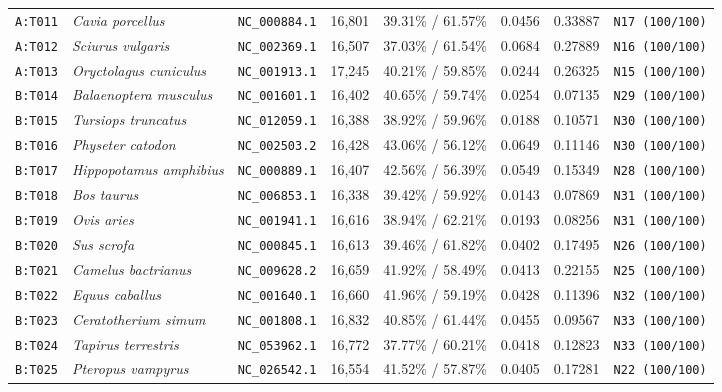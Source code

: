 \documentclass[10pt,letterpaper]{article}
\begin{document}
\begin{longtable}{llllllll}
\texttt{A:T011} & \textit{Cavia porcellus} & \texttt{NC\_000884.1} & 16,801 & 39.31\% / 61.57\% & 0.0456 & 0.33887 & \texttt{N17 (100/100)} \\
\texttt{A:T012} & \textit{Sciurus vulgaris} & \texttt{NC\_002369.1} & 16,507 & 37.03\% / 61.54\% & 0.0684 & 0.27889 & \texttt{N16 (100/100)} \\
\texttt{A:T013} & \textit{Oryctolagus cuniculus} & \texttt{NC\_001913.1} & 17,245 & 40.21\% / 59.85\% & 0.0244 & 0.26325 & \texttt{N15 (100/100)} \\
\texttt{B:T014} & \textit{Balaenoptera musculus} & \texttt{NC\_001601.1} & 16,402 & 40.65\% / 59.74\% & 0.0254 & 0.07135 & \texttt{N29 (100/100)} \\
\texttt{B:T015} & \textit{Tursiops truncatus} & \texttt{NC\_012059.1} & 16,388 & 38.92\% / 59.96\% & 0.0188 & 0.10571 & \texttt{N30 (100/100)} \\
\texttt{B:T016} & \textit{Physeter catodon} & \texttt{NC\_002503.2} & 16,428 & 43.06\% / 56.12\% & 0.0649 & 0.11146 & \texttt{N30 (100/100)} \\
\texttt{B:T017} & \textit{Hippopotamus amphibius} & \texttt{NC\_000889.1} & 16,407 & 42.56\% / 56.39\% & 0.0549 & 0.15349 & \texttt{N28 (100/100)} \\
\texttt{B:T018} & \textit{Bos taurus} & \texttt{NC\_006853.1} & 16,338 & 39.42\% / 59.92\% & 0.0143 & 0.07869 & \texttt{N31 (100/100)} \\
\texttt{B:T019} & \textit{Ovis aries} & \texttt{NC\_001941.1} & 16,616 & 38.94\% / 62.21\% & 0.0193 & 0.08256 & \texttt{N31 (100/100)} \\
\texttt{B:T020} & \textit{Sus scrofa} & \texttt{NC\_000845.1} & 16,613 & 39.46\% / 61.82\% & 0.0402 & 0.17495 & \texttt{N26 (100/100)} \\
\texttt{B:T021} & \textit{Camelus bactrianus} & \texttt{NC\_009628.2} & 16,659 & 41.92\% / 58.49\% & 0.0413 & 0.22155 & \texttt{N25 (100/100)} \\
\texttt{B:T022} & \textit{Equus caballus} & \texttt{NC\_001640.1} & 16,660 & 41.96\% / 59.19\% & 0.0428 & 0.11396 & \texttt{N32 (100/100)} \\
\texttt{B:T023} & \textit{Ceratotherium simum} & \texttt{NC\_001808.1} & 16,832 & 40.85\% / 61.44\% & 0.0455 & 0.09567 & \texttt{N33 (100/100)} \\
\texttt{B:T024} & \textit{Tapirus terrestris} & \texttt{NC\_053962.1} & 16,772 & 37.77\% / 60.21\% & 0.0418 & 0.12823 & \texttt{N33 (100/100)} \\
\texttt{B:T025} & \textit{Pteropus vampyrus} & \texttt{NC\_026542.1} & 16,554 & 41.52\% / 57.87\% & 0.0405 & 0.17281 & \texttt{N22 (100/100)} \\

\end{longtable}
\end{document}
